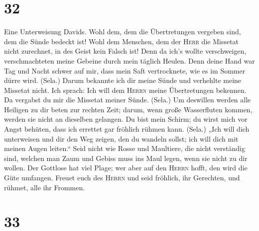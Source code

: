 \hypertarget{section-31}{%
\section{32}\label{section-31}}

 Eine Unterweisung Davids. Wohl dem, dem die Übertretungen
vergeben sind, dem die Sünde bedeckt ist!  Wohl dem
Menschen, dem der \textsc{Herr} die Missetat nicht zurechnet, in des
Geist kein Falsch ist!  Denn da ich's wollte verschweigen,
verschmachteten meine Gebeine durch mein täglich Heulen. 
Denn deine Hand war Tag und Nacht schwer auf mir, dass mein Saft
vertrocknete, wie es im Sommer dürre wird. (Sela.)  Darum
bekannte ich dir meine Sünde und verhehlte meine Missetat nicht. Ich
sprach: Ich will dem \textsc{Herrn} meine Übertretungen bekennen. Da
vergabst du mir die Missetat meiner Sünde. (Sela.)  Um
deswillen werden alle Heiligen zu dir beten zur rechten Zeit; darum,
wenn große Wasserfluten kommen, werden sie nicht an dieselben gelangen.
 Du bist mein Schirm; du wirst mich vor Angst behüten,
dass ich errettet gar fröhlich rühmen kann. (Sela.)  „Ich
will dich unterweisen und dir den Weg zeigen, den du wandeln sollst; ich
will dich mit meinen Augen leiten.``  Seid nicht wie Rosse
und Maultiere, die nicht verständig sind, welchen man Zaum und Gebiss
muss ins Maul legen, wenn sie nicht zu dir wollen.  Der
Gottlose hat viel Plage; wer aber auf den \textsc{Herrn} hofft, den wird
die Güte umfangen.  Freuet euch des \textsc{Herrn} und
seid fröhlich, ihr Gerechten, und rühmet, alle ihr Frommen.

\hypertarget{section-32}{%
\section{33}\label{section-32}}

